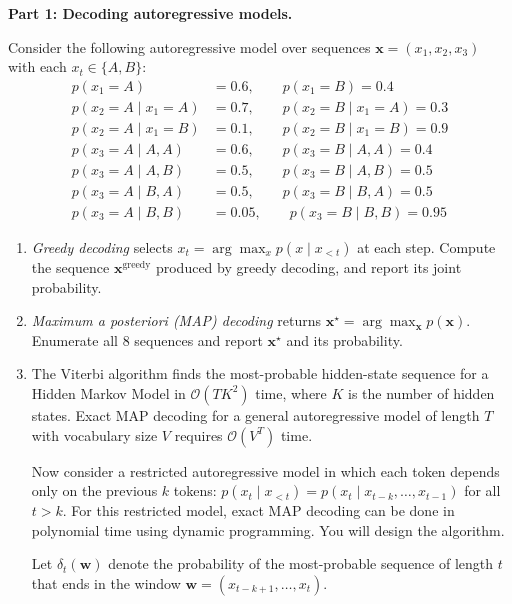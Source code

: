 \documentclass[submit]{harvardml}
\begin{document}
\begin{framed}
\noindent \textbf{Part 1: Decoding autoregressive models.}

\noindent Consider the following autoregressive model over sequences $\mathbf{x} = (x_1, x_2, x_3)$ with each $x_t \in \{A, B\}$:
\begin{align*}
  p(x_1 = A) &= 0.6, \qquad p(x_1 = B) = 0.4 \\
  p(x_2 = A \mid x_1 = A) &= 0.7, \qquad p(x_2 = B \mid x_1 = A) = 0.3 \\
  p(x_2 = A \mid x_1 = B) &= 0.1, \qquad p(x_2 = B \mid x_1 = B) = 0.9 \\
  p(x_3 = A \mid A, A) &= 0.6, \qquad p(x_3 = B \mid A, A) = 0.4 \\
  p(x_3 = A \mid A, B) &= 0.5, \qquad p(x_3 = B \mid A, B) = 0.5 \\
  p(x_3 = A \mid B, A) &= 0.5, \qquad p(x_3 = B \mid B, A) = 0.5 \\
  p(x_3 = A \mid B, B) &= 0.05, \qquad p(x_3 = B \mid B, B) = 0.95
\end{align*}

\begin{enumerate}
  \item[1a.] \emph{Greedy decoding} selects $x_t = \arg\max_{x} p(x \mid x_{<t})$ at each step. Compute the sequence $\mathbf{x}^{\text{greedy}}$ produced by greedy decoding, and report its joint probability.
  
  \item[1b.] \emph{Maximum a posteriori (MAP) decoding} returns $\mathbf{x}^{\star} = \arg\max_{\mathbf{x}} p(\mathbf{x})$. Enumerate all 8 sequences and report $\mathbf{x}^{\star}$ and its probability.
  
  \item[1c.] The Viterbi algorithm finds the most-probable hidden-state sequence for a Hidden Markov Model in $\mathcal{O}(TK^2)$ time, where $K$ is the number of hidden states. Exact MAP decoding for a general autoregressive model of length $T$ with vocabulary size $V$ requires $\mathcal{O}(V^T)$ time.

  Now consider a restricted autoregressive model in which each token depends only on the previous $k$ tokens: $p(x_t \mid x_{<t}) = p(x_t \mid x_{t-k}, \ldots, x_{t-1})$ for all $t > k$. For this restricted model, exact MAP decoding can be done in polynomial time using dynamic programming. You will design the algorithm.

  Let $\delta_t(\mathbf{w})$ denote the probability of the most-probable sequence of length $t$ that ends in the window $\mathbf{w} = (x_{t-k+1}, \ldots, x_t)$.
  

\end{enumerate}
\end{framed}
\end{document}
